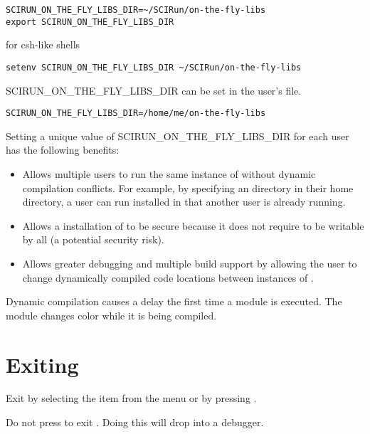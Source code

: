 \begin{verbatim}
SCIRUN_ON_THE_FLY_LIBS_DIR=~/SCIRun/on-the-fly-libs
export SCIRUN_ON_THE_FLY_LIBS_DIR
\end{verbatim}

for csh-like shells

\begin{verbatim}
setenv SCIRUN_ON_THE_FLY_LIBS_DIR ~/SCIRun/on-the-fly-libs
\end{verbatim}

SCIRUN\_ON\_THE\_FLY\_LIBS\_DIR can be set in the user's
 file.

\begin{verbatim}
SCIRUN_ON_THE_FLY_LIBS_DIR=/home/me/on-the-fly-libs
\end{verbatim}

Setting a unique value of SCIRUN\_ON\_THE\_FLY\_LIBS\_DIR for each
\sr{} user has the following benefits:

\begin{itemize}
\item Allows multiple users to run the same instance of \sr{} without
  dynamic compilation conflicts.  For example, by specifying an
   directory in their home directory, a user
  can run \sr{} installed in  that another user
  is already running.

\item Allows a  installation of \sr{}
  to be secure because it does not require
   to be writable by
  all (a potential security risk).

\item Allows greater debugging and multiple build support by
  allowing the user to change dynamically compiled code locations
  between instances of \sr{}.

\end{itemize}

Dynamic compilation causes a delay the first time a module is
executed.  The module changes color while it is being
compiled.

\section{Exiting \sr{}}
\label{sec:stopping}

Exit \sr{} by selecting the  item from the 
menu or by pressing .

Do not press  to exit \sr{}.  Doing this will drop
\sr{} into a debugger.


